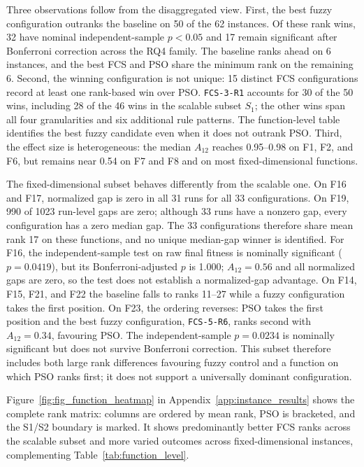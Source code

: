 \afterpage{\restoreportraitheight}

Three observations follow from the disaggregated view. First, the best fuzzy configuration outranks the baseline on 50 of the 62 instances. Of these rank wins, 32 have nominal independent-sample $p<0.05$ and 17 remain significant after Bonferroni correction across the RQ4 family. The baseline ranks ahead on 6 instances, and the best FCS and PSO share the minimum rank on the remaining 6. Second, the winning configuration is not unique: 15 distinct FCS configurations record at least one rank-based win over PSO. \texttt{FCS-3-R1} accounts for 30 of the 50 wins, including 28 of the 46 wins in the scalable subset $S_1$; the other wins span all four granularities and six additional rule patterns. The function-level table identifies the best fuzzy candidate even when it does not outrank PSO. Third, the effect size is heterogeneous: the median $A_{12}$ reaches 0.95--0.98 on F1, F2, and F6, but remains near 0.54 on F7 and F8 and on most fixed-dimensional functions.

The fixed-dimensional subset behaves differently from the scalable one. On F16 and F17, normalized gap is zero in all 31 runs for all 33 configurations. On F19, 990 of 1023 run-level gaps are zero; although 33 runs have a nonzero gap, every configuration has a zero median gap. The 33 configurations therefore share mean rank 17 on these functions, and no unique median-gap winner is identified. For F16, the independent-sample test on raw final fitness is nominally significant ($p=0.0419$), but its Bonferroni-adjusted $p$ is 1.000; $A_{12}=0.56$ and all normalized gaps are zero, so the test does not establish a normalized-gap advantage. On F14, F15, F21, and F22 the baseline falls to ranks 11--27 while a fuzzy configuration takes the first position. On F23, the ordering reverses: PSO takes the first position and the best fuzzy configuration, \texttt{FCS-5-R6}, ranks second with $A_{12}=0.34$, favouring PSO. The independent-sample $p=0.0234$ is nominally significant but does not survive Bonferroni correction. This subset therefore includes both large rank differences favouring fuzzy control and a function on which PSO ranks first; it does not support a universally dominant configuration.

Figure~\ref{fig:fig_function_heatmap} in Appendix~\ref{app:instance_results} shows the complete rank matrix: columns are ordered by mean rank, PSO is bracketed, and the S1/S2 boundary is marked. It shows predominantly better FCS ranks across the scalable subset and more varied outcomes across fixed-dimensional instances, complementing Table~\ref{tab:function_level}.


